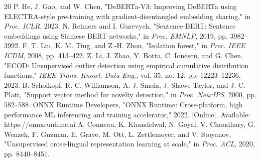 \documentclass[conference]{IEEEtran}
\begin{document}
\begin{thebibliography}{20}
 P. He, J. Gao, and W. Chen, "DeBERTa-V3: Improving DeBERTa using ELECTRA-style pre-training with gradient-disentangled embedding sharing," in \emph{Proc. ICLR}, 2023.
 N. Reimers and I. Gurevych, "Sentence-BERT: Sentence embeddings using Siamese BERT-networks," in \emph{Proc. EMNLP}, 2019, pp. 3982--3992.
 F. T. Liu, K. M. Ting, and Z.-H. Zhou, "Isolation forest," in \emph{Proc. IEEE ICDM}, 2008, pp. 413--422.
 Z. Li, J. Zhao, Y. Botta, C. Ionescu, and G. Chen, "ECOD: Unsupervised outlier detection using empirical cumulative distribution functions," \emph{IEEE Trans. Knowl. Data Eng.}, vol. 35, no. 12, pp. 12223--12236, 2023.
 B. Scholkopf, R. C. Williamson, A. J. Smola, J. Shawe-Taylor, and J. C. Platt, "Support vector method for novelty detection," in \emph{Proc. NeurIPS}, 2000, pp. 582--588.
 ONNX Runtime Developers, "ONNX Runtime: Cross-platform, high performance ML inferencing and training accelerator," 2022. [Online]. Available: https://onnxruntime.ai
 A. Conneau, K. Khandelwal, N. Goyal, V. Chaudhary, G. Wenzek, F. Guzman, E. Grave, M. Ott, L. Zettlemoyer, and V. Stoyanov, "Unsupervised cross-lingual representation learning at scale," in \emph{Proc. ACL}, 2020, pp. 8440--8451.
\end{thebibliography}
\end{document}
